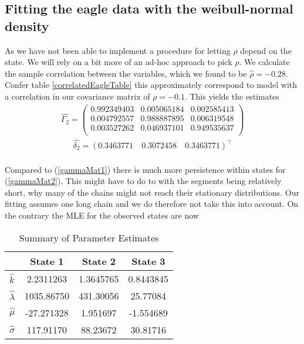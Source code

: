\subsection{Fitting the eagle data with the weibull-normal density}
As we have not been able to implement a procedure for letting $\rho$ depend on the state. We will rely on a bit more of an ad-hoc approach to pick $\rho$. We calculate the sample correlation between the variables, which we found to be $\hat{\rho} = -0.28$. Confer table \ref{correlatedEagleTable} this approximately correspond to model with a correlation in our covariance matrix of $\rho = -0.1$. This yields the estimates 
\begin{align}
\hat{\Gamma_2} = 
\begin{pmatrix}
0.992349403 & 0.005065184 & 0.002585413 \\
0.004792557 & 0.988887895 & 0.006319548 \\
0.003527262 & 0.046937101 & 0.949535637 \\
\end{pmatrix}\label{gammaMat2}
\end{align}
\begin{align}
  \hat{\delta_2} = 
  \left(0.3463771 \quad 0.3072458 \quad 0.3463771 \right)^\top
\end{align}\\
Compared to (\ref{gammaMat1}) there is much more persistence within states for (\ref{gammaMat2}). This might have to do to with the segments being relatively short, why many of the chains might not reach their stationary distributions. Our fitting assumes one long chain and we do therefore not take this into account. On the contrary the MLE for the observed states are now
\begin{table}[h]
  \centering
  \begin{tabular}{lccc}
   & \textbf{State 1} & \textbf{State 2} & \textbf{State 3} \\
  \hline
   $\hat{k}$ & 2.2311263 & 1.3645765 & 0.8443845 \\
   $\hat{\lambda}$ & 1035.86750 & 431.30056 & 25.77084 \\
   $\hat{\mu}$ & -27.271328 & 1.951697 & -1.554689 \\
   $\hat{\sigma}$ & 117.91170 & 88.23672 & 30.81716 \\
  \end{tabular}
  \caption{Summary of Parameter Estimates}
  \label{ParameterEstimatesNew}
\end{table}\\
